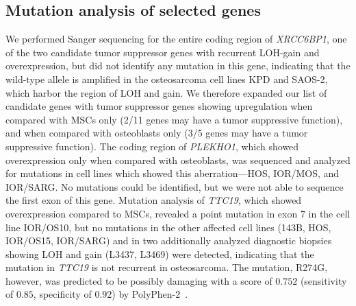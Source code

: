 \subsection{Mutation analysis of selected genes}
We performed Sanger sequencing for the entire coding region of {\it XRCC6BP1}, one of the two candidate tumor suppressor genes with recurrent LOH-gain and overexpression, but did not identify any mutation in this gene, indicating that the wild\hyp{}type allele is amplified in the osteosarcoma cell lines KPD and SAOS-2, which harbor the region of LOH and gain. We therefore expanded our list of candidate genes with tumor suppressor genes showing upregulation when compared with MSCs only (2/11 genes may have a tumor suppressive function), and when compared with osteoblasts only (3/5 genes may have a tumor suppressive function). The coding region of {\it PLEKHO1}, which showed overexpression only when compared with osteoblasts, was sequenced and analyzed for mutations in cell lines which showed this aberration---HOS, IOR/MOS, and IOR/SARG. No mutations could be identified, but we were not able to sequence the first exon of this gene. Mutation analysis of {\it TTC19}, which showed overexpression compared to MSCs, revealed a point mutation in exon 7 in the cell line IOR/OS10, but no mutations in the other affected cell lines (143B, HOS, IOR/OS15, IOR/SARG) and in two additionally analyzed diagnostic biopsies showing LOH and gain (L3437, L3469) were detected, indicating that the mutation in {\it TTC19} is not recurrent in osteosarcoma. The mutation, R274G, however, was predicted to be possibly damaging with a score of $0.752$ (sensitivity of $0.85$, specificity of $0.92$) by PolyPhen-2~\cite{adzhubei2010method}.

